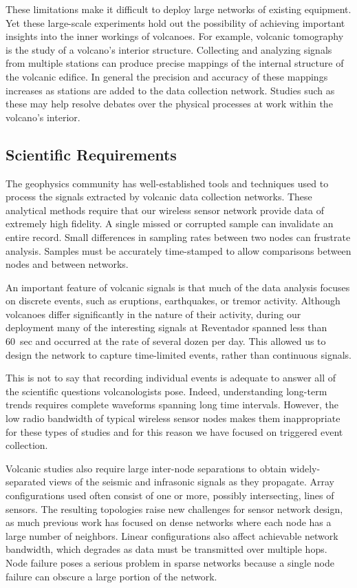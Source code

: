 These limitations make it difficult to deploy large networks of existing
equipment. Yet these large-scale experiments hold out the possibility of
achieving important insights into the inner workings of volcanoes.  For
example, volcanic tomography~\cite{lees-tomography} is the study of a
volcano's interior structure.  Collecting and analyzing signals from 
multiple stations can produce precise mappings of the internal structure of
the volcanic edifice.  In general the precision and accuracy of these
mappings increases as stations are added to the data collection network.
Studies such as these may help resolve debates over the physical processes at
work within the volcano's interior.

\subsection{Scientific Requirements}

The geophysics community has well-established tools and techniques used to
process the signals extracted by volcanic data collection networks.  These
analytical methods require that our wireless sensor network provide data of
extremely high fidelity.  A single missed or corrupted sample can invalidate
an entire record. Small differences in sampling rates between two nodes can
frustrate analysis.  Samples must be accurately time-stamped to allow
comparisons between nodes and between networks.

An important feature of volcanic signals is that much of the data analysis
focuses on discrete events, such as eruptions, earthquakes, or tremor
activity.  Although volcanoes differ significantly in the nature of their
activity, during our deployment many of the interesting signals at
Reventador spanned less than 60~sec and occurred at the rate of several dozen
per day. This allowed us to design the network to capture
time-limited events, rather than continuous signals. 

This is not to say that recording individual events is adequate to answer all
of the scientific questions volcanologists pose.  Indeed, understanding
long-term trends requires complete waveforms spanning long time intervals.
However, the low radio bandwidth of typical wireless sensor nodes makes them
inappropriate for these types of studies and for this reason we have focused
on triggered event collection.


Volcanic studies also require large inter-node separations to obtain
widely-separated views of the seismic and infrasonic signals as they
propagate.  Array configurations used often consist of one or more, possibly
intersecting, lines of sensors. The resulting topologies raise new challenges
for sensor network design, as much previous work has focused on dense
networks where each node has a large number of neighbors.  Linear
configurations also affect achievable network bandwidth, which degrades as
data must be transmitted over multiple hops.  Node failure poses a serious
problem in sparse networks because a single node failure can obscure a
large portion of the network.

